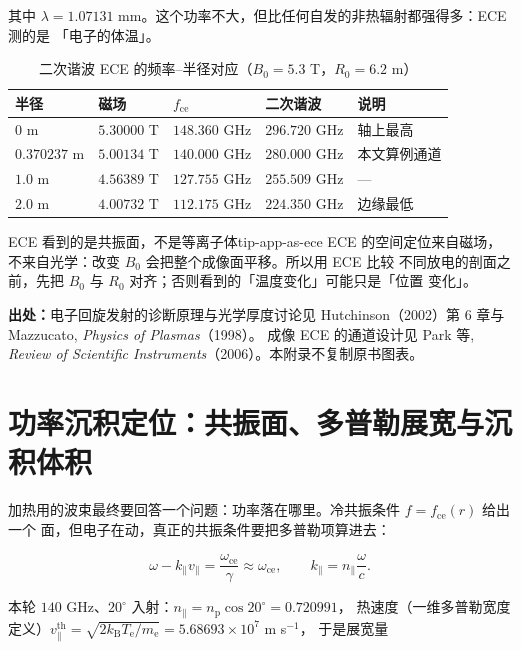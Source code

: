 其中 $\lambda=1.07131$ mm。这个功率不大，但比任何自发的非热辐射都强得多：ECE 测的是
「电子的体温」。

\begin{table}[htbp]
\centering
\small
\caption{二次谐波 ECE 的频率--半径对应（$B_0=5.3$ T，$R_0=6.2$ m）}
\label{tab:app-as-ece}
\begin{tabular}{p{2.5cm}p{2.4cm}p{2.6cm}p{2.6cm}p{2.7cm}}
\hline
半径 & 磁场 & $f_\mathrm{ce}$ & 二次谐波 & 说明 \\
\hline
$0$ m & $5.30000$ T & $148.360$ GHz & $296.720$ GHz & 轴上最高 \\
$0.370237$ m & $5.00134$ T & $140.000$ GHz & $280.000$ GHz & 本文算例通道 \\
$1.0$ m & $4.56389$ T & $127.755$ GHz & $255.509$ GHz & --- \\
$2.0$ m & $4.00732$ T & $112.175$ GHz & $224.350$ GHz & 边缘最低 \\
\hline
\end{tabular}
\end{table}

\begin{tip}{ECE 看到的是共振面，不是等离子体}{tip-app-as-ece}
ECE 的空间定位来自磁场，不来自光学：改变 $B_0$ 会把整个成像面平移。所以用 ECE 比较
不同放电的剖面之前，先把 $B_0$ 与 $R_0$ 对齐；否则看到的「温度变化」可能只是「位置
变化」。
\end{tip}

{\footnotesize
\textbf{出处：}电子回旋发射的诊断原理与光学厚度讨论见 Hutchinson（2002）第 6 章与
Mazzucato, \emph{Physics of Plasmas}（1998）。
成像 ECE 的通道设计见 Park 等,
\emph{Review of Scientific Instruments}（2006）。本附录不复制原书图表。
}


\section{功率沉积定位：共振面、多普勒展宽与沉积体积}
\label{sec:app-as-deposition}

加热用的波束最终要回答一个问题：功率落在哪里。冷共振条件 $f=f_\mathrm{ce}(r)$ 给出一个
面，但电子在动，真正的共振条件要把多普勒项算进去：

\begin{equation}
\omega-k_\parallel v_\parallel=\frac{\omega_\mathrm{ce}}{\gamma}
\approx\omega_\mathrm{ce},
\qquad k_\parallel=n_\parallel\frac{\omega}{c}.
\label{eq:app-as-resonance}
\end{equation}

本轮 $140$ GHz、$20^\circ$ 入射：$n_\parallel=n_\mathrm{p}\cos20^\circ=0.720991$，
热速度（一维多普勒宽度定义）$v_\parallel^\mathrm{th}=\sqrt{2k_\mathrm{B}T_\mathrm{e}/m_\mathrm{e}}=5.68693\times10^{7}$ m s$^{-1}$，
于是展宽量

